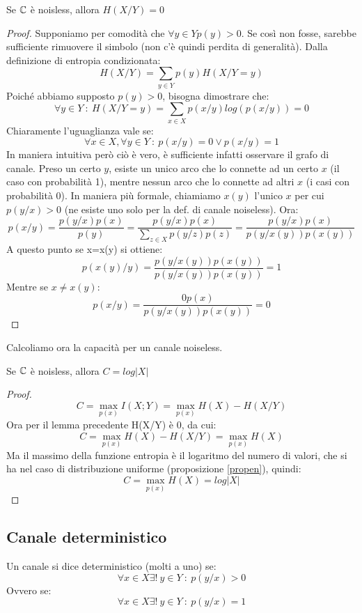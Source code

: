 \begin{lemma}
 Se $\mathbb{C}$ è noisless, allora $H(X/Y)=0$
 \begin{proof}
 Supponiamo per comodità
 che $\forall y \in Y p(y)>0$. Se così non fosse, sarebbe sufficiente rimuovere il simbolo (non c'è quindi perdita di generalità).
 Dalla definizione di entropia condizionata:
 \[
  H(X/Y)=\sum_{y \in Y} p(y)H(X/Y=y)
 \]
 Poiché abbiamo supposto $p(y)>0$, bisogna dimostrare che:
 \[
  \forall y \in Y \ : \ H(X/Y=y)=\sum_{x \in X}p(x/y) log( p(x/y)) =0
 \]
 Chiaramente l'uguaglianza vale se: 
 \[
  \forall x \in X, \forall y \in Y \ : \ p(x/y)=0 \lor p(x/y)=1
 \]
 In maniera intuitiva però ciò è vero, è sufficiente infatti osservare il grafo di canale. Preso un certo $y$, esiste un unico 
 arco che lo connette ad un certo $x$ (il caso con probabilità 1), mentre nessun arco che lo connette ad altri $x$ (i casi con 
 probabilità 0).
 In maniera più formale, chiamiamo $x(y)$ l'unico $x$ per cui $p(y/x)>0$ (ne esiste uno solo per la def. di canale noiseless).
 Ora:
 \[
  p(x/y)=\frac{p(y/x)p(x)}{p(y)}=\frac{p(y/x)p(x)}{ \displaystyle\sum_{z \in X} p(y/z)p(z)}=
  \frac{p(y/x)p(x)}{ p(y/x(y))p(x(y))}
 \]
 A questo punto se x=x(y) si ottiene:
 \[
  p(x(y)/y)=\frac{p(y/x(y))p(x(y))}{ p(y/x(y))p(x(y))}=1
 \]
 Mentre se $x\neq x(y)$:
 \[
  p(x/y)=\frac{0 p(x)}{ p(y/x(y))p(x(y))}=0
 \]
 \end{proof}
\end{lemma}

\noindent
Calcoliamo ora la capacità per un canale noiseless.

\begin{lemma}
Se $\mathbb{C}$ è noisless, allora $C=log|X|$
\begin{proof}
 \[
  C=\max_{p(x)} I(X;Y)=\max_{p(x)} H(X)-H(X/Y)
 \]
 Ora per il lemma precedente H(X/Y) è 0, da cui:
 \[
  C=\max_{p(x)} H(X)-H(X/Y)=\max_{p(x)} H(X)
 \]
 Ma il massimo della funzione entropia è il logaritmo del numero di valori, che 
 si ha nel caso di distribuzione uniforme (proposizione \ref{propen}), quindi:
 \[
  C=\max_{p(x)} H(X)=log|X|
 \]
\end{proof}
\end{lemma}

\subsection{Canale deterministico}

\medskip

\begin{definizione}
 Un canale si dice deterministico (molti a uno) se:
\[
 \forall x \in X \exists ! \ y \in Y \ : \ p(y/x) > 0
\]
Ovvero se:
\[
 \forall x \in X \exists ! \ y \in Y \ : \ p(y/x)=1
\]
\end{definizione}

